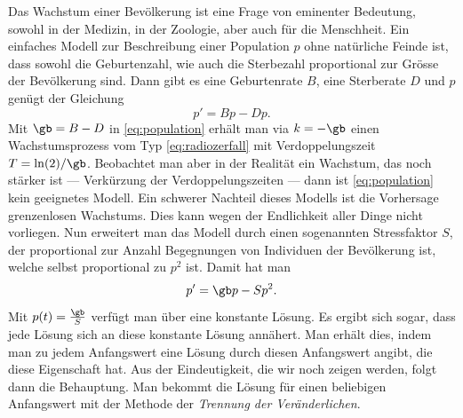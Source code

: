 \documentclass[%
draft,
11pt,%
twoside,%
titlepage,%
german,%
headsepline%
]{scrartcl}
\begin{document}
Das
Wachstum einer Bev\"olkerung ist eine Frage von eminenter Bedeutung, sowohl in der Medizin, in der Zoologie, aber auch f\"ur die Menschheit.
Ein einfaches Modell zur Beschreibung einer Population $p$ ohne nat\"urliche Feinde ist, dass sowohl die Geburtenzahl, wie auch die Sterbezahl proportional zur Gr\"osse der Bev\"olkerung sind. Dann gibt es eine Geburtenrate $B$, eine Sterberate $D$ und $p$ gen\"ugt der Gleichung
\begin{equation}\label{eq:population}
p'=Bp-Dp.
\end{equation}
Mit $\gb=B-D$ in \eqref{eq:population} erh\"alt man via $k=-\gb$ einen Wachstumsprozess vom Typ \eqref{eq:radiozerfall} mit Verdoppelungszeit $T=\ln(2)/\gb$. Beobachtet man aber in der Realit\"at ein Wachstum, das noch st\"arker ist --- Verk\"urzung der Verdoppelungszeiten --- dann ist \eqref{eq:population} kein geeignetes Modell. Ein schwerer Nachteil dieses Modells ist die Vorhersage grenzenlosen Wachstums. Dies kann wegen der Endlichkeit aller Dinge nicht vorliegen. Nun erweitert man das Modell durch einen sogenannten Stressfaktor $S$, der proportional zur Anzahl Begegnungen von Individuen der Bev\"olkerung ist, welche selbst proportional zu $p^2$ ist. Damit hat man
\begin{equation}\label{eq:populationstress}
p'=\gb p-Sp^2.
\end{equation}
Mit $p(t)=\frac{\gb}{S}$
verf\"ugt man \"uber eine konstante L\"osung. Es ergibt sich sogar, dass jede L\"osung sich an diese konstante L\"osung ann\"ahert. Man erh\"alt dies, indem man zu jedem Anfangswert eine L\"osung durch diesen Anfangswert angibt, die diese Eigenschaft hat. Aus der Eindeutigkeit, die wir noch zeigen werden, folgt dann die Behauptung. Man bekommt die L\"osung f\"ur einen beliebigen Anfangswert mit der Methode der \emph{Trennung der Ver\"anderlichen}.
\end{document}
